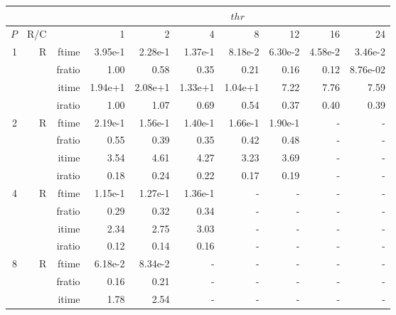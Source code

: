\documentclass[a4paper]{article}
\begin{document}
\begin{table}[htbp]
\begin{center}
\begin{small}
\begin{tabular}{|r|r|r|r|r|r|r|r|r|r|}
\hline 
     & & & \multicolumn{7}{c|}{$thr$} \\ \hline
    $P$ & R/C &  & 1           & 2    & 4    & 8    & 12   & 16    & 24  \\ \hline\hline
   1 &  R &   ftime &    3.95e-1 &    2.28e-1 &    1.37e-1 &    8.18e-2 &    6.30e-2 &    4.58e-2 &    3.46e-2 \\
             &             &  fratio &    1.00 &    0.58 &    0.35 &   0.21 &    0.16 &   0.12 &    8.76e-02\\
             &             &  itime &    1.94e+1 &   2.08e+1 &   1.33e+1 &   1.04e+1 &   7.22  &    7.76  &    7.59  \\
             &             &  iratio &    1.00 &    1.07  &   0.69 &    0.54 &    0.37 &    0.40 &    0.39 \\\hline
   2 &  R &   ftime &    2.19e-1 &    1.56e-1 &    1.40e-1 &    1.66e-1 &    1.90e-1 &      - &      - \\
             &             &  fratio &    0.55 &    0.39 &    0.35 &    0.42 &    0.48 &      - &      - \\
             &             &  itime &    3.54  &    4.61  &    4.27  &    3.23  &    3.69  &      - &      - \\
             &             &  iratio &    0.18 &    0.24 &    0.22 &    0.17 &    0.19 &      - &      - \\\hline
   4 &  R &   ftime &    1.15e-1 &    1.27e-1 &    1.36e-1 &      - &      - &      - &      - \\
             &             &  fratio &    0.29 &    0.32 &    0.34 &      - &      - &      - &      - \\
             &             &  itime &    2.34  &    2.75  &    3.03  &      - &      - &      - &      - \\
             &             &  iratio &    0.12 &    0.14 &    0.16 &      - &      - &      - &      - \\\hline
   8 &   R &   ftime &    6.18e-2 &    8.34e-2 &      - &      - &      - &      - &      - \\
             &             &  fratio &    0.16 &    0.21 &      - &      - &      - &      - &      - \\
             &             &  itime &    1.78  &    2.54  &      - &      - &      - &      - &      - \\

\end{tabular}
\end{small}
\end{center}
\end{table}
\end{document}
